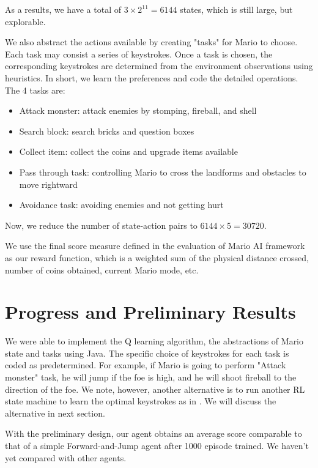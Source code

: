 As a results, we have a total of $3\times 2^{11} = 6144$ states, which is still large, but explorable.

We also abstract the actions available by creating "tasks" for Mario to choose. Each task may consist a series of keystrokes. Once a task is chosen, the corresponding keystrokes are determined from the environment observations using heuristics. In short, we learn the preferences and code the detailed operations. The 4 tasks are:
\begin{itemize}
\item Attack monster: attack enemies by stomping, fireball, and shell
\item Search block: search bricks and question boxes
\item Collect item: collect the coins and upgrade items available
\item Pass through task: controlling Mario to cross the landforms and obstacles to move rightward
\item Avoidance task: avoiding enemies and not getting hurt
\end{itemize}

Now, we reduce the number of state-action pairs to $6144\times 5 = 30720$.

We use the final score measure defined in the evaluation of Mario AI framework as our reward function, which is a weighted sum of the physical distance crossed, number of coins obtained, current Mario mode, etc.

\section{Progress and Preliminary Results}
We were able to implement the Q learning algorithm, the abstractions of Mario state and tasks using Java. The specific choice of keystrokes for each task is coded as predetermined. For example, if Mario is going to perform "Attack monster" task, he will jump if the foe is high, and he will shoot fireball to the direction of the foe. We note, however, another alternative is to run another RL state machine to learn the optimal keystrokes as in \cite{mohan2011object}. We will discuss the alternative in next section.

With the preliminary design, our agent obtains an average score comparable to that of a simple Forward-and-Jump agent after 1000 episode trained. We haven't yet compared with other agents.

